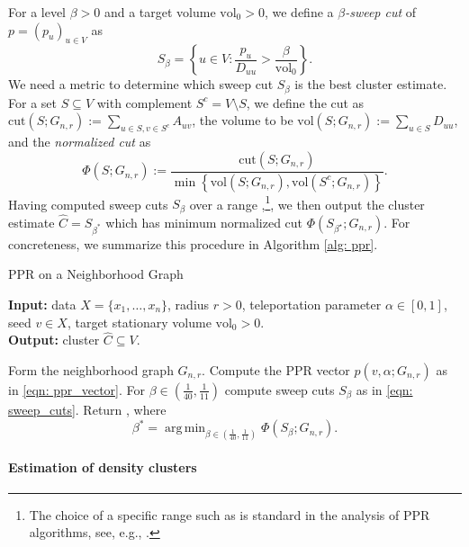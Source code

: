 \documentclass{article}
\newcommand{\set}[1]{\left\{#1\right\}}
\newcommand{\vol}{\mathrm{vol}}
\newcommand{\cut}{\mathrm{cut}}
\newcommand{\1}{\mathbf{1}}
\newcommand{\pbf}{p}        %
\newcommand{\Abf}{A}
\newcommand{\Xbf}{X}             %
\newcommand{\Dbf}{D}
\newcommand{\Cest}{\widehat{C}}
\DeclareMathOperator*{\argmin}{arg\,min}
\theoremstyle{aldenthm}
\theoremstyle{aldenrmrk}
\begin{document}
For a level $\beta > 0$ and a target volume $\vol_0 > 0$, we define a
\emph{$\beta$-sweep cut} of $\pbf = (p_u)_{u \in V}$ as  
\begin{equation}
\label{eqn: sweep_cuts}
S_\beta = \set{u \in V: \frac{p_u}{\Dbf_{uu}} > \frac{\beta}{\vol_{0}}}.
\end{equation}
We need a metric to determine which sweep cut $S_{\beta}$ is the best cluster estimate. For a set $S \subseteq V$ with complement $S^c = V \setminus S$, we define the cut as $\cut(S;G_{n,r}) := \sum_{u \in S, v \in S^c} \Abf_{uv}$, the volume to be $\vol(S; G_{n,r}) := \sum_{u \in S} \Dbf_{uu}$, and the \emph{normalized cut} as
\begin{equation}
\label{eqn: normalized_cut}
\Phi(S; G_{n,r}) := \frac{\cut(S;G_{n,r})}{\min \set{\vol(S; G_{n,r}), \vol(S^c; G_{n,r})}}.
\end{equation}
Having computed sweep cuts $S_{\beta}$ over a range ,\footnote{The choice of a specific range such as 
 is standard in the analysis of PPR
algorithms, see, e.g., \citep{zhu2013}.}, we then output the cluster estimate $\widehat{C} = S_{\beta^*}$ which has minimum normalized cut $\Phi(S_{\beta^{\star}}; G_{n,r})$. For concreteness, we summarize this procedure in Algorithm \ref{alg: ppr}.

\begin{algorithm}
	\caption{PPR on a Neighborhood Graph}
	\label{alg: ppr}	
	{\bfseries Input:} data $\Xbf=\{x_1,\ldots,x_n\}$, radius $r > 0$, teleportation 
	parameter $\alpha \in [0,1]$, seed $v \in \Xbf$, target stationary volume $\vol_0 >
	0$. \\   
	{\bfseries Output:} cluster $\Cest \subseteq V$.
	\begin{algorithmic}[1]
		\STATE Form the neighborhood graph $G_{n,r}$.
		\STATE Compute the PPR vector $\pbf(v, \alpha; G_{n,r})$ as in \eqref{eqn:
			ppr_vector}. 
		\STATE For $\beta \in (\frac{1}{40}, \frac{1}{11})$ compute sweep cuts
		$S_{\beta}$ as in \eqref{eqn: sweep_cuts}.
		\STATE Return \smash{$\Cest = S_{\beta^*}$}, where 
		$$
		\beta^* = \argmin_{\beta \in (\frac{1}{40}, \frac{1}{11})} \Phi(S_{\beta}; G_{n,r}).
		$$
	\end{algorithmic}
\end{algorithm}

\paragraph{Estimation of density clusters}
\end{document}
